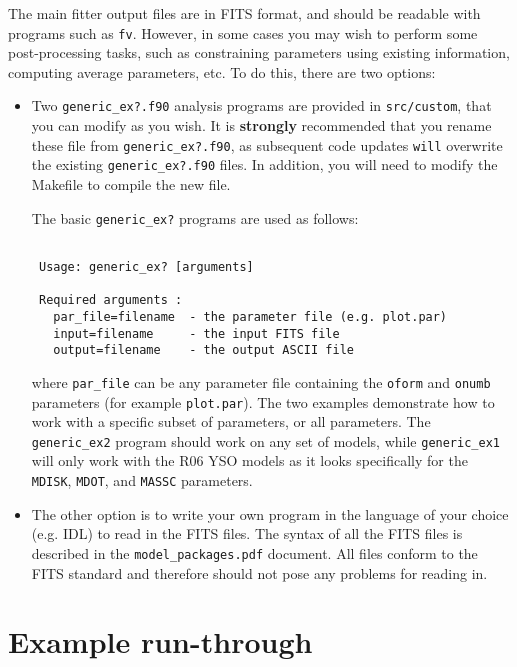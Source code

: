 \documentclass[letterpaper,11pt]{report}
\begin{document}
The main fitter output files are in FITS format, and should be readable with programs such as \texttt{fv}. However, in some cases you may wish to perform some post-processing tasks, such as constraining parameters using existing information, computing average parameters, etc. To do this, there are two options:

\begin{itemize}

\item Two \texttt{generic\_ex?.f90} analysis programs are provided in \texttt{src/custom}, that you can modify as you wish. It is \textbf{strongly} recommended that you rename these file from \texttt{generic\_ex?.f90}, as subsequent code updates \texttt{will} overwrite the existing \texttt{generic\_ex?.f90} files. In addition, you will need to modify the Makefile to compile the new file.

The basic \texttt{generic\_ex?} programs are used as follows:

\begin{Verbatim}[frame=single,label=Syntax]

 Usage: generic_ex? [arguments]
 
 Required arguments :
   par_file=filename  - the parameter file (e.g. plot.par)
   input=filename     - the input FITS file
   output=filename    - the output ASCII file

\end{Verbatim}

where \texttt{par\_file} can be any parameter file containing the \texttt{oform} and \texttt{onumb} parameters (for example \texttt{plot.par}). The two examples demonstrate how to work with a specific subset of parameters, or all parameters. The \texttt{generic\_ex2} program should work on any set of models, while \texttt{generic\_ex1} will only work with the R06 YSO models as it looks specifically for the \texttt{MDISK}, \texttt{MDOT}, and \texttt{MASSC} parameters.

\item The other option is to write your own program in the language of your choice (e.g. IDL) to read in the FITS files. The syntax of all the FITS files is described in the \texttt{model\_packages.pdf} document. All files conform to the FITS standard and therefore should not pose any problems for reading in.

\end{itemize}

\chapter{Example run-through}
\end{document}
